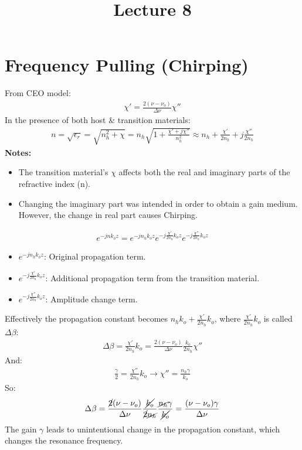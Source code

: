 \documentclass[11pt]{article}
\title{Lecture 8}
\author{}
\date{}
\begin{document}
\maketitle

\section{Frequency Pulling (Chirping)}

From CEO model:
\begin{align*}
    \chi' = \frac{2(\nu - \nu_o)}{\Delta \nu} \chi''
\end{align*}
In the presence of both host \& transition materials:
\begin{align*}
    n = \sqrt{\epsilon_r} = \sqrt{n_h^2 + \chi} = n_h \sqrt{1 + \frac{\chi' +j \chi''}{n_h^2}} \approx n_h + \frac{\chi'}{2n_h} + j \frac{\chi''}{2n_h}
\end{align*}
\textbf{Notes:}
\begin{itemize}
    \item The transition material's $\chi$ affects both the real and imaginary parts of the refractive index (n).
    \item Changing the imaginary part was intended in order to obtain a gain medium. However, the change in real part causes Chirping.  
\end{itemize}
\begin{align*}
    e^{-jnk_o z} = e^{-jn_h k_o z} e^{-j \frac{\chi'}{2n_h} k_o z} e^{-j \frac{\chi''}{2n_h} k_o z}
\end{align*}
\begin{itemize}
    \item $e^{-jn_h k_o z}$: Original propagation term.
    \item $e^{-j \frac{\chi'}{2n_h} k_o z}$: Additional propagation term from the transition material.
    \item $e^{-j \frac{\chi''}{2n_h} k_o z}$: Amplitude change term.
\end{itemize}
Effectively the propagation constant becomes $n_h k_o + \frac{\chi'}{2n_h} k_o$, where $\frac{\chi'}{2n_h} k_o$ is called $\Delta \beta$:
\begin{align*}
    \Delta \beta = \frac{\chi'}{2n_h} k_o = \frac{2(\nu - \nu_o)}{\Delta \nu} \frac{k_o}{2n_h} \chi''
\end{align*}
And:
\begin{align*}
    \frac{\gamma}{2} = \frac{\chi''}{2n_h} k_o \rightarrow \chi'' = \frac{n_h \gamma}{k_o}
\end{align*}
So: 
\begin{align*}
    \Delta \beta = \frac{\cancel{2} (\nu - \nu_o)}{\Delta \nu} \frac{\cancel{k_o}}{\cancel{2} \cancel{n_h}} \frac{\cancel{n_h} \gamma}{\cancel{k_o}} = \frac{(\nu - \nu_o) \gamma}{\Delta \nu}
\end{align*}
The gain $\gamma$ leads to unintentional change in the propagation constant, which changes the resonance frequency.
\end{document}
